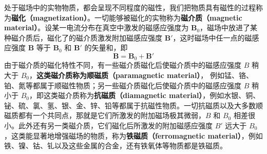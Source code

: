 
处于磁场中的实物物质，都会呈现不同程度的磁性，我们把物质具有磁性的过程称为\textbf{磁化（magnetization）}。一切能够被磁化的实物称为\textbf{磁介质（magnetic material）}。设某一电流分布在真空中激发的磁感应强度为 $\mathbf B_0$，磁场中放进了某种磁介质后，磁化了的磁介质激发附加磁感应强度 $\mathbf B'$，这时磁场中任一点的磁感应强度 $\mathbf B $ 等于 $\mathbf B_0$ 和 $\mathbf B'$ 的矢量和，即
\begin{equation}
\mathbf B=\mathbf B_0+\mathbf B'
\end{equation}
由于磁介质的磁化特性不同，有一些磁介质磁化后使磁介质中的磁感应强度 $B$ 稍大于 $B_0$，\textbf{这类磁介质称为顺磁质（paramagnetic material）}， 例如锰、铬、铂、氮等都属于顺磁性物质；另一些磁介质磁化后使磁介质中的磁感应强度 $B$ 稍小于 $B_0$，即这类磁介质称为\textbf{抗磁质（diamagnetic material）}，例如水银、铜、铋、硫、氯、氢、银、金、锌、铅等都属于抗磁性物质。一切抗磁质以及大多数顺磁质都有一个共同点，那就是它们所激发的附加磁场极其微弱，$B$ 和 $B_0$ 相差很小。此外还有另一类磁介质，它们磁化后所激发的附加磁感应强度 $B'$ 远大于 $B_0$，这类能显著地增强磁场的物质，称为\textbf{铁磁质（ferromagnetic material）}，例如铁、镍、钴、钆以及这些金属的合金，还有铁氧体等物质都是铁磁质。